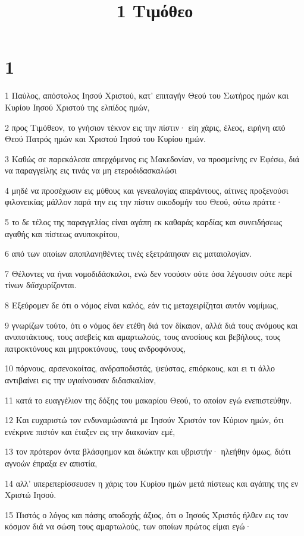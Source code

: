 

\title{1 Τιμόθεο}


\chapter{1}

\par 1 Παύλος, απόστολος Ιησού Χριστού, κατ' επιταγήν Θεού του Σωτήρος ημών και Κυρίου Ιησού Χριστού της ελπίδος ημών,
\par 2 προς Τιμόθεον, το γνήσιον τέκνον εις την πίστιν· είη χάρις, έλεος, ειρήνη από Θεού Πατρός ημών και Χριστού Ιησού του Κυρίου ημών.
\par 3 Καθώς σε παρεκάλεσα απερχόμενος εις Μακεδονίαν, να προσμείνης εν Εφέσω, διά να παραγγείλης εις τινάς να μη ετεροδιδασκαλώσι
\par 4 μηδέ να προσέχωσιν εις μύθους και γενεαλογίας απεράντους, αίτινες προξενούσι φιλονεικίας μάλλον παρά την εις την πίστιν οικοδομήν του Θεού, ούτω πράττε·
\par 5 το δε τέλος της παραγγελίας είναι αγάπη εκ καθαράς καρδίας και συνειδήσεως αγαθής και πίστεως ανυποκρίτου,
\par 6 από των οποίων αποπλανηθέντες τινές εξετράπησαν εις ματαιολογίαν.
\par 7 Θέλοντες να ήναι νομοδιδάσκαλοι, ενώ δεν νοούσιν ούτε όσα λέγουσιν ούτε περί τίνων διϊσχυρίζονται.
\par 8 Εξεύρομεν δε ότι ο νόμος είναι καλός, εάν τις μεταχειρίζηται αυτόν νομίμως,
\par 9 γνωρίζων τούτο, ότι ο νόμος δεν ετέθη διά τον δίκαιον, αλλά διά τους ανόμους και ανυποτάκτους, τους ασεβείς και αμαρτωλούς, τους ανοσίους και βεβήλους, τους πατροκτόνους και μητροκτόνους, τους ανδροφόνους,
\par 10 πόρνους, αρσενοκοίτας, ανδραποδιστάς, ψεύστας, επιόρκους, και ει τι άλλο αντιβαίνει εις την υγιαίνουσαν διδασκαλίαν,
\par 11 κατά το ευαγγέλιον της δόξης του μακαρίου Θεού, το οποίον εγώ ενεπιστεύθην.
\par 12 Και ευχαριστώ τον ενδυναμώσαντά με Ιησούν Χριστόν τον Κύριον ημών, ότι ενέκρινε πιστόν και έταξεν εις την διακονίαν εμέ,
\par 13 τον πρότερον όντα βλάσφημον και διώκτην και υβριστήν· ηλεήθην όμως, διότι αγνοών έπραξα εν απιστία,
\par 14 αλλ' υπερεπερίσσευσεν η χάρις του Κυρίου ημών μετά πίστεως και αγάπης της εν Χριστώ Ιησού.
\par 15 Πιστός ο λόγος και πάσης αποδοχής άξιος, ότι ο Ιησούς Χριστός ήλθεν εις τον κόσμον διά να σώση τους αμαρτωλούς, των οποίων πρώτος είμαι εγώ·
